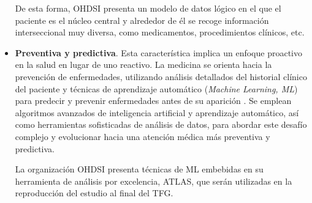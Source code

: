 \begin{itemize}
De esta forma, OHDSI presenta un modelo de datos lógico en el que el paciente es el núcleo central y alrededor de él se recoge información interseccional muy diversa, como medicamentos, procedimientos clínicos, etc.




\item \textbf{Preventiva y predictiva}. Esta característica implica un enfoque proactivo en la salud en lugar de uno reactivo. La medicina se orienta hacia la prevención de enfermedades, utilizando análisis detallados del historial clínico del paciente y técnicas de aprendizaje automático (\textit{Machine Learning, ML}) para predecir y prevenir enfermedades antes de su aparición \cite{ruiz2023inteligencia}. Se emplean algoritmos avanzados de inteligencia artificial y aprendizaje automático, así como herramientas sofisticadas de análisis de datos, para abordar este desafío complejo y evolucionar hacia una atención médica más preventiva y predictiva.

La organización OHDSI presenta técnicas de ML embebidas en su herramienta de análisis por excelencia, ATLAS, que serán utilizadas en la reproducción del estudio al final del TFG.


\end{itemize}
